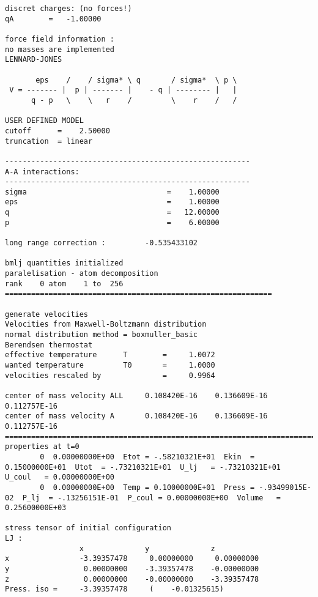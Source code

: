 \documentclass[a4paper]{article}
\begin{document}
\begin{verbatim}
discret charges: (no forces!)
qA        =   -1.00000

force field information :                      
no masses are implemented                      
LENNARD-JONES                  

       eps    /    / sigma* \ q       / sigma*  \ p \
 V = ------- |  p | ------- |    - q | -------- |   |
      q - p   \    \   r    /         \    r    /   /

USER DEFINED MODEL                             
cutoff      =    2.50000
truncation  = linear                                                      

--------------------------------------------------------
A-A interactions:
--------------------------------------------------------
sigma                                =    1.00000
eps                                  =    1.00000
q                                    =   12.00000
p                                    =    6.00000

long range correction :         -0.535433102
 
bmlj quantities initialized
paralelisation - atom decomposition
rank    0 atom    1 to  256
=============================================================

generate velocities
Velocities from Maxwell-Boltzmann distribution
normal distribution method = boxmuller_basic     
Berendsen thermostat
effective temperature      T        =     1.0072
wanted temperature         T0       =     1.0000
velocities rescaled by              =     0.9964

center of mass velocity ALL     0.108420E-16    0.136609E-16    0.112757E-16
center of mass velocity A       0.108420E-16    0.136609E-16    0.112757E-16
=====================================================================================================================================
properties at t=0
        0  0.00000000E+00  Etot = -.58210321E+01  Ekin  = 0.15000000E+01  Utot  = -.73210321E+01  U_lj   = -.73210321E+01  U_coul   = 0.00000000E+00
        0  0.00000000E+00  Temp = 0.10000000E+01  Press = -.93499015E-02  P_lj  = -.13256151E-01  P_coul = 0.00000000E+00  Volume   = 0.25600000E+03
 
stress tensor of initial configuration
LJ : 
                 x              y              z
x                -3.39357478     0.00000000     0.00000000
y                 0.00000000    -3.39357478    -0.00000000
z                 0.00000000    -0.00000000    -3.39357478
Press. iso =     -3.39357478     (    -0.01325615)



\end{verbatim}
\end{document}
